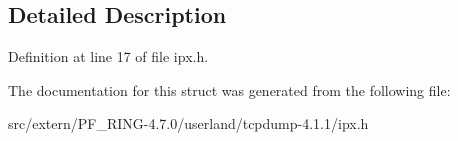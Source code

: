 \subsection{Detailed Description}


Definition at line 17 of file ipx.h.



The documentation for this struct was generated from the following file:\begin{DoxyCompactItemize}
\item 
src/extern/PF\_\-RING-\/4.7.0/userland/tcpdump-\/4.1.1/ipx.h\end{DoxyCompactItemize}
